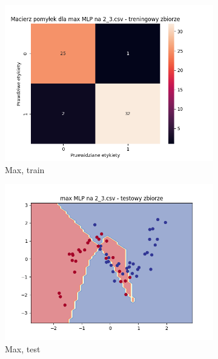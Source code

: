 \documentclass[12pt]{article}
\newcommand*{\subfigwidth}{0.24\textwidth}
\begin{document}
\begin{figure}[H]
\begin{subfigure}[t]{\subfigwidth}
        \includegraphics[width=\linewidth]{img/exp_3/mlp/2_3/max/train_matrix.png}
        \caption{Max, train}
    \end{subfigure}
    \hfill
    \begin{subfigure}[t]{\subfigwidth}
        \includegraphics[width=\linewidth]{img/exp_3/mlp/2_3/max/test_boundary.png}
        \caption{Max, test}
    \end{subfigure}
    \hfill
    \begin{subfigure}[t]{\subfigwidth}

\end{subfigure}
\end{figure}
\end{document}
